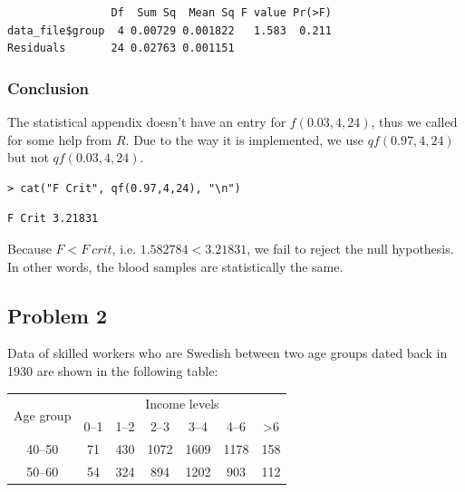 \documentclass[a4paper]{article}
\numberwithin{equation}{section}
\begin{document}
\begin{mdframed}[leftline=false,rightline=false,backgroundcolor=magenta!10,nobreak=true]
  \begin{verbatim}
                Df  Sum Sq  Mean Sq F value Pr(>F)
data_file$group  4 0.00729 0.001822   1.583  0.211
Residuals       24 0.02763 0.001151
  \end{verbatim}
\end{mdframed}

\subsubsection{Conclusion}
The statistical appendix doesn't have an entry for \(f(0.03, 4, 24)\), thus we called for some help from \(R\).
Due to the way it is implemented, we use \(qf(0.97, 4, 24)\) but not \(qf(0.03, 4, 24)\).
\begin{mdframed}[leftline=false,rightline=false,backgroundcolor=magenta!10,nobreak=true]
  \begin{verbatim}
> cat("F Crit", qf(0.97,4,24), "\n")
  \end{verbatim}
  \begin{verbatim}
F Crit 3.21831
  \end{verbatim}
\end{mdframed}

Because \(F < F\ crit\), i.e. \(1.582784 < 3.21831\), we fail to reject the null hypothesis.
In other words, the blood samples are statistically the same.

\newpage
\subsection{Problem 2}\label{p2}
Data of skilled workers who are Swedish between two age groups dated back in 1930 are shown in the following table:

\begin{center}
  \begin{tabular}{ccccccc}
    \toprule
    \multirow{2}{*}{Age group} & \multicolumn{6}{c}{Income levels}                                   \\
    \cmidrule(lr){2-7}
                               & 0--1                              & 1--2 & 2--3 & 3--4 & 4--6 & >6  \\
    \midrule
    40--50                     & 71                                & 430  & 1072 & 1609 & 1178 & 158 \\
    50--60                     & 54                                & 324  & 894  & 1202 & 903  & 112 \\
    \bottomrule
  \end{tabular}
\end{center}
\end{document}
